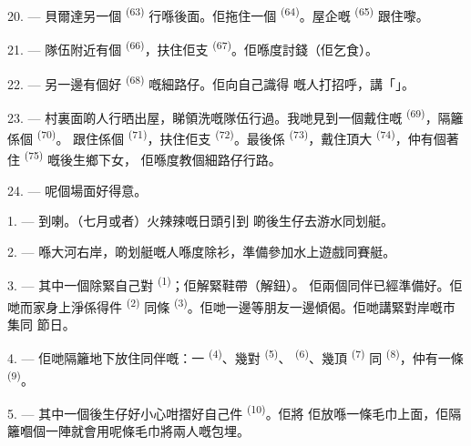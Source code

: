 20. --- 貝爾達另一個 \textsuperscript{(63)} 行喺後面。佢拖住一個
 \textsuperscript{(64)}。屋企嘅 \textsuperscript{(65)}
跟住嚟。

\VUsaut{4.6mm}
\VUsaut{3.4mm}

21. --- 隊伍附近有個 \textsuperscript{(66)}，扶住佢支
\textsuperscript{(67)}。佢喺度討錢（佢乞食）。

22. --- 另一邊有個好 \textsuperscript{(68)} 嘅細路仔。佢向自己識得
嘅人打招呼，講「」。

23. --- 村裏面啲人行晒出屋，睇領洗嘅隊伍行過。我哋見到一個戴住嘅
 \textsuperscript{(69)}，隔籬係個 \textsuperscript{(70)}。
跟住係個 \textsuperscript{(71)}，扶住佢支
\textsuperscript{(72)}。最後係 \textsuperscript{(73)}，戴住頂大
 \textsuperscript{(74)}，仲有個著住 \textsuperscript{(75)}
嘅後生鄉下女，
佢喺度教個細路仔行路。

24. --- 呢個場面好得意。

\VUsaut{4.0mm}
\VUsaut{3.0mm}

\VUsaut{2.4mm}

\VUsaut{3.0mm}

1. --- 到喇。（七月或者）火辣辣嘅日頭引到
啲後生仔去游水同划艇。

2. --- 喺大河右岸，啲划艇嘅人喺度除衫，準備參加水上遊戲同賽艇。

3. --- 其中一個除緊自己對 \textsuperscript{(1)}；佢解緊鞋帶（解鈕）。
佢兩個同伴已經準備好。佢哋而家身上淨係得件 \textsuperscript{(2)} 同條
 \textsuperscript{(3)}。佢哋一邊等朋友一邊傾偈。佢哋講緊對岸嘅市集同
節日。

4. --- 佢哋隔籬地下放住同伴嘅：一
\textsuperscript{(4)}、幾對 \textsuperscript{(5)}、
\textsuperscript{(6)}、幾頂 \textsuperscript{(7)} 同
\textsuperscript{(8)}，仲有一條 \textsuperscript{(9)}。

5. --- 其中一個後生仔好小心咁摺好自己件 \textsuperscript{(10)}。佢將
佢放喺一條毛巾上面，佢隔籬嗰個一陣就會用呢條毛巾將兩人嘅包埋。


